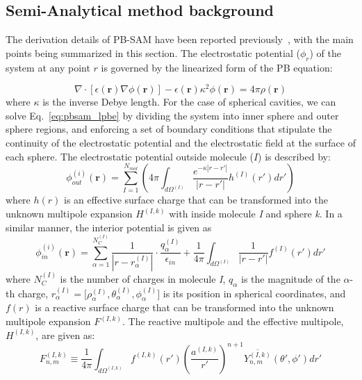 \documentclass[12pt,titlepage]{article}
\begin{document}
\subsection{Semi-Analytical method background}
The derivation details of PB-SAM have been reported  previously~\cite{Yap2010, Yap2013}, with the main points being summarized in this section. The electrostatic potential ($\phi_r$) of the system at any point $r$ is governed by the linearized form of the PB equation:

\begin{equation}
\nabla \cdot [ \epsilon(\mathbf{r}) \nabla \phi (\mathbf{r}) ] - \epsilon (\mathbf{r}) \kappa^2 \phi(\mathbf{r}) = 4 \pi \rho(\mathbf{r})
\label{eq:pbsam_lpbe}
\end{equation}
%
where $\kappa$ is the inverse Debye length. For the case of spherical cavities, we can solve Eq.~\ref{eq:pbsam_lpbe} by dividing the system into inner sphere and outer sphere regions, and enforcing a set of boundary conditions that stipulate the continuity of the electrostatic potential and the electrostatic field at the surface of each sphere. The electrostatic potential outside molecule ($I$) is described by:
%
\begin{equation}
\phi_{out}^{(i)} (\mathbf{r})  = \sum_{I=1}^{N_{mol}} \left( 4 \pi \int_{d\Omega^{(I)}} \frac{e^{-\kappa | r - r'|}}{|r - r'|} h^{(I)} (r') dr'  \right)
\label{eq:pbsam_phi_in}
\end{equation}
%
where \(h(r)\) is an effective surface charge that can be transformed into the unknown multipole expansion \(H^{(I,k)}\) with inside molecule \textit{I} and sphere \textit{k}. In a similar manner, the interior potential is given as
%
\begin{equation}
\phi_{in}^{(i)} (\mathbf{r})  = \sum_{\alpha = 1}^{N_C^{(I)}} \frac{1}{|r-r_{\alpha}^{(I)}|} \cdot \frac{q_\alpha^{(I)}} {\epsilon_{in}} + \frac{1}{4\pi} \int_{d\Omega^{(I)}} \frac{1}{|r - r'|} f^{(I)} (r') dr' 
\label{eq:pbsam_phi_out}
\end{equation}
%
where \( N_C^{(I)}\) is the number of charges in molecule \textit{I}, \( q_\alpha\) 
is the magnitude of the \(\alpha\)-th charge, \( r_\alpha^{(I)} = \Big[\rho_{\alpha}^{(I)} , \theta_{\alpha}^{(I)} , \phi_{\alpha}^{(I)} \Big]\) is its position in spherical 
coordinates, and \(f(r)\) is a reactive surface charge that can
be transformed into the unknown multipole expansion \(F^{(I,k)}\). The reactive multipole and the effective multipole, \(H^{(I,k)}\), are given as:
%
\begin{equation}
F_{n,m}^{(I,k)} \equiv  \frac{1}{4\pi} \int_{d\Omega^{(I,k)}} f^{(I,k)}(r') \left (  \frac{ a^{(I,k)}}  {r'} \right ) ^{n+1} \overline{ Y^{(I,k)}_{n,m}} (\theta' , \phi') dr'
\label{eq:fmat}
\end{equation}
\end{document}
